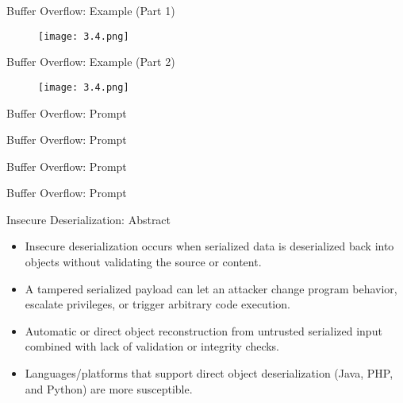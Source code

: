 \documentclass[t,ignorenonframetext]{beamer}
\begin{document}
\begin{frame}{Buffer Overflow: Example (Part 1)}
\begin{figure}[htb]
	\centering
	\texttt{[image: 3.4.png]}
\end{figure}

\end{frame}
\begin{frame}{Buffer Overflow: Example (Part 2)}
\begin{figure}[htb]
	\centering
	\texttt{[image: 3.4.png]}
\end{figure}

\end{frame}
\begin{frame}{Buffer Overflow: Prompt}
\begin{tcolorbox}
[colback=blue!5!white,colframe=navy!75!black,title=Persona]

\end{tcolorbox}
\end{frame}
\begin{frame}{Buffer Overflow: Prompt}
\begin{tcolorbox}
[colback=blue!5!white,colframe=navy!75!black,title=Context]

\end{tcolorbox}
\end{frame}

\begin{frame}{Buffer Overflow: Prompt}
\begin{tcolorbox}
[colback=blue!5!white,colframe=navy!75!black,title=Tasks (Part 1)]

\end{tcolorbox}
\end{frame}

\begin{frame}{Buffer Overflow: Prompt}
\begin{tcolorbox}
[colback=blue!5!white,colframe=navy!75!black,title=Tasks (Part 2)]

\end{tcolorbox}
\end{frame}

\begin{frame}{Insecure Deserialization: Abstract}
\begin{itemize}
    \item Insecure deserialization occurs when serialized data is deserialized back into objects without validating the source or content.
    \item A tampered serialized payload can let an attacker change program behavior, escalate privileges, or trigger arbitrary code execution.
    \item Automatic or direct object reconstruction from untrusted serialized input combined with lack of validation or integrity checks.
    \item Languages/platforms that support direct object deserialization (Java, PHP, and Python) are more susceptible.
\end{itemize}
\end{frame}
\end{document}
